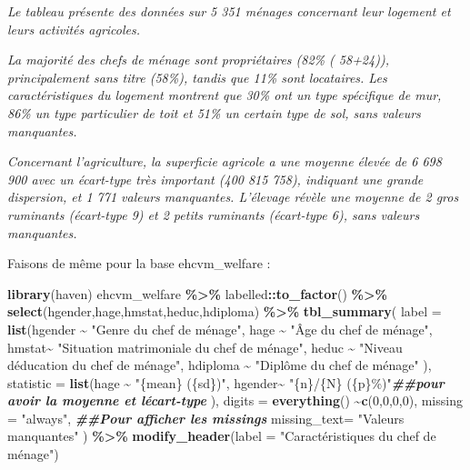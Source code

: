\documentclass[
]{article}
\newenvironment{Shaded}{\begin{snugshade}}{\end{snugshade}}
\newcommand{\AttributeTok}[1]{\textcolor[rgb]{0.13,0.29,0.53}{#1}}
\newcommand{\DecValTok}[1]{\textcolor[rgb]{0.00,0.00,0.81}{#1}}
\newcommand{\DocumentationTok}[1]{\textcolor[rgb]{0.56,0.35,0.01}{\textbf{\textit{#1}}}}
\newcommand{\FunctionTok}[1]{\textcolor[rgb]{0.13,0.29,0.53}{\textbf{#1}}}
\newcommand{\NormalTok}[1]{#1}
\newcommand{\SpecialCharTok}[1]{\textcolor[rgb]{0.81,0.36,0.00}{\textbf{#1}}}
\newcommand{\StringTok}[1]{\textcolor[rgb]{0.31,0.60,0.02}{#1}}
\begin{document}
\emph{Le tableau présente des données sur 5 351 ménages concernant leur
logement et leurs activités agricoles.}

\emph{La majorité des chefs de ménage sont propriétaires (82\% (
58+24)), principalement sans titre (58\%), tandis que 11\% sont
locataires. Les caractéristiques du logement montrent que 30\% ont un
type spécifique de mur, 86\% un type particulier de toit et 51\% un
certain type de sol, sans valeurs manquantes.}

\emph{Concernant l'agriculture, la superficie agricole a une moyenne
élevée de 6 698 900 avec un écart-type très important (400 815 758),
indiquant une grande dispersion, et 1 771 valeurs manquantes. L'élevage
révèle une moyenne de 2 gros ruminants (écart-type 9) et 2 petits
ruminants (écart-type 6), sans valeurs manquantes.}

Faisons de même pour la base ehcvm\_welfare :

\begin{Shaded}
\begin{Highlighting}[]
\FunctionTok{library}\NormalTok{(haven)}
\NormalTok{ehcvm\_welfare }\SpecialCharTok{\%\textgreater{}\%}\NormalTok{ labelled}\SpecialCharTok{::}\FunctionTok{to\_factor}\NormalTok{() }\SpecialCharTok{\%\textgreater{}\%} \FunctionTok{select}\NormalTok{(hgender,hage,hmstat,heduc,hdiploma) }\SpecialCharTok{\%\textgreater{}\%} \FunctionTok{tbl\_summary}\NormalTok{( }
  \AttributeTok{label =} \FunctionTok{list}\NormalTok{(hgender }\SpecialCharTok{\textasciitilde{}} \StringTok{"Genre du chef de ménage"}\NormalTok{,}
\NormalTok{ hage }\SpecialCharTok{\textasciitilde{}} \StringTok{"Âge du chef de ménage"}\NormalTok{,}
\NormalTok{ hmstat}\SpecialCharTok{\textasciitilde{}} \StringTok{"Situation matrimoniale du chef de ménage"}\NormalTok{,}
\NormalTok{ heduc }\SpecialCharTok{\textasciitilde{}} \StringTok{"Niveau d\textquotesingle{}éducation du chef de ménage"}\NormalTok{,}
\NormalTok{ hdiploma }\SpecialCharTok{\textasciitilde{}} \StringTok{"Diplôme du chef de ménage"}
\NormalTok{ ),}
 \AttributeTok{statistic =} \FunctionTok{list}\NormalTok{(hage }\SpecialCharTok{\textasciitilde{}} \StringTok{"\{mean\} (\{sd\})"}\NormalTok{,}
\NormalTok{                  hgender}\SpecialCharTok{\textasciitilde{}} \StringTok{"\{n\}/\{N\} (\{p\}\%)"}\DocumentationTok{\#\#pour avoir la moyenne et l\textquotesingle{}écart{-}type}
\NormalTok{                  ),}
 \AttributeTok{digits =} \FunctionTok{everything}\NormalTok{() }\SpecialCharTok{\textasciitilde{}}\FunctionTok{c}\NormalTok{(}\DecValTok{0}\NormalTok{,}\DecValTok{0}\NormalTok{,}\DecValTok{0}\NormalTok{,}\DecValTok{0}\NormalTok{),}
 \AttributeTok{missing =} \StringTok{"always"}\NormalTok{,  }\DocumentationTok{\#\#Pour afficher les missings}
 \AttributeTok{missing\_text=} \StringTok{"Valeurs manquantes"}
\NormalTok{ ) }\SpecialCharTok{\%\textgreater{}\%} \FunctionTok{modify\_header}\NormalTok{(}\AttributeTok{label =} \StringTok{"Caractéristiques du chef de ménage"}\NormalTok{)}
\end{Highlighting}
\end{Shaded}
\end{document}
